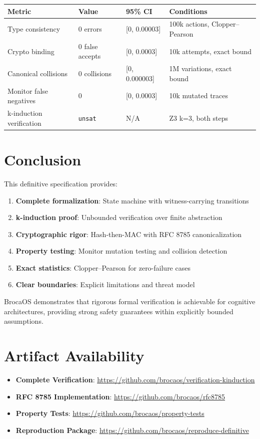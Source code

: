 \documentclass[12pt]{article}
\begin{document}
\begin{center}
\small
\begin{tabular}{@{}p{}p{}p{}p{}@{}}
\toprule
\textbf{Metric} & \textbf{Value} & \textbf{95\% CI} & \textbf{Conditions} \\
\midrule
Type consistency & 0 errors & [0, 0.00003] & 100k actions, Clopper--Pearson \\
Crypto binding & 0 false accepts & [0, 0.0003] & 10k attempts, exact bound \\
Canonical collisions & 0 collisions & [0, 0.000003] & 1M variations, exact bound \\
Monitor false negatives & 0 & [0, 0.0003] & 10k mutated traces \\
k-induction verification & \texttt{unsat} & N/A & Z3 k=3, both steps \\
\bottomrule
\end{tabular}
\end{center}

\section{Conclusion}

This definitive specification provides:
\begin{enumerate}
    \item \textbf{Complete formalization}: State machine with witness-carrying transitions
    \item \textbf{k-induction proof}: Unbounded verification over finite abstraction
    \item \textbf{Cryptographic rigor}: Hash-then-MAC with RFC 8785 canonicalization
    \item \textbf{Property testing}: Monitor mutation testing and collision detection
    \item \textbf{Exact statistics}: Clopper--Pearson for zero-failure cases
    \item \textbf{Clear boundaries}: Explicit limitations and threat model
\end{enumerate}

BrocaOS demonstrates that rigorous formal verification is achievable for cognitive architectures, providing strong safety guarantees within explicitly bounded assumptions.

\section*{Artifact Availability}

\begin{itemize}
    \item \textbf{Complete Verification}: \url{https://github.com/brocaos/verification-kinduction}
    \item \textbf{RFC 8785 Implementation}: \url{https://github.com/brocaos/rfc8785}
    \item \textbf{Property Tests}: \url{https://github.com/brocaos/property-tests}
    \item \textbf{Reproduction Package}: \url{https://github.com/brocaos/reproduce-definitive}
\end{itemize}
\end{document}
